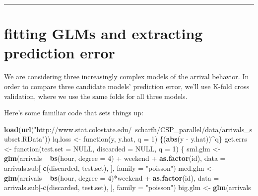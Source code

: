 \documentclass[]{article}
\newenvironment{Shaded}{\begin{snugshade}}{\end{snugshade}}
\newcommand{\KeywordTok}[1]{\textcolor[rgb]{0.13,0.29,0.53}{\textbf{{#1}}}}
\newcommand{\DataTypeTok}[1]{\textcolor[rgb]{0.13,0.29,0.53}{{#1}}}
\newcommand{\DecValTok}[1]{\textcolor[rgb]{0.00,0.00,0.81}{{#1}}}
\newcommand{\StringTok}[1]{\textcolor[rgb]{0.31,0.60,0.02}{{#1}}}
\newcommand{\OtherTok}[1]{\textcolor[rgb]{0.56,0.35,0.01}{{#1}}}
\newcommand{\NormalTok}[1]{{#1}}
\begin{document}
\begin{center}\rule{0.5\linewidth}{\linethickness}\end{center}

\section{fitting GLMs and extracting prediction
error}\label{fitting-glms-and-extracting-prediction-error}

We are considering three increasingly complex models of the arrival
behavior. In order to compare three candidate models' prediction error,
we'll use K-fold cross validation, where we use the same folds for all
three models.

Here's some familiar code that sets things up:

\begin{Shaded}
\begin{Highlighting}[]
\KeywordTok{load}\NormalTok{(}\KeywordTok{url}\NormalTok{(}\StringTok{"http://www.stat.colostate.edu/~scharfh/CSP_parallel/data/arrivals_subset.RData"}\NormalTok{))}
\NormalTok{lq.loss <-}\StringTok{ }\NormalTok{function(y, y.hat, }\DataTypeTok{q =} \DecValTok{1}\NormalTok{) \{(}\KeywordTok{abs}\NormalTok{(y -}\StringTok{ }\NormalTok{y.hat))^q\}}
\NormalTok{get.errs <-}\StringTok{ }\NormalTok{function(}\DataTypeTok{test.set =} \OtherTok{NULL}\NormalTok{,}
                     \DataTypeTok{discarded =} \OtherTok{NULL}\NormalTok{,}
                     \DataTypeTok{q =} \DecValTok{1}\NormalTok{) \{}
    \NormalTok{sml.glm <-}\StringTok{ }\KeywordTok{glm}\NormalTok{(arrivals ~}
\StringTok{                   }\KeywordTok{bs}\NormalTok{(hour, }\DataTypeTok{degree =} \DecValTok{4}\NormalTok{)}
                   \NormalTok{+}\StringTok{ }\NormalTok{weekend}
                   \NormalTok{+}\StringTok{ }\KeywordTok{as.factor}\NormalTok{(id),}
                   \DataTypeTok{data =} \NormalTok{arrivals.sub[-}\KeywordTok{c}\NormalTok{(discarded, test.set), ],}
                   \DataTypeTok{family =} \StringTok{"poisson"}\NormalTok{)}
    \NormalTok{med.glm <-}\StringTok{ }\KeywordTok{glm}\NormalTok{(arrivals ~}
\StringTok{                   }\KeywordTok{bs}\NormalTok{(hour, }\DataTypeTok{degree =} \DecValTok{4}\NormalTok{)*weekend}
                   \NormalTok{+}\StringTok{ }\KeywordTok{as.factor}\NormalTok{(id),}
                   \DataTypeTok{data =} \NormalTok{arrivals.sub[-}\KeywordTok{c}\NormalTok{(discarded, test.set), ],}
                   \DataTypeTok{family =} \StringTok{"poisson"}\NormalTok{)}
    \NormalTok{big.glm <-}\StringTok{ }\KeywordTok{glm}\NormalTok{(arrivals ~}

\end{Highlighting}
\end{Shaded}
\end{document}

